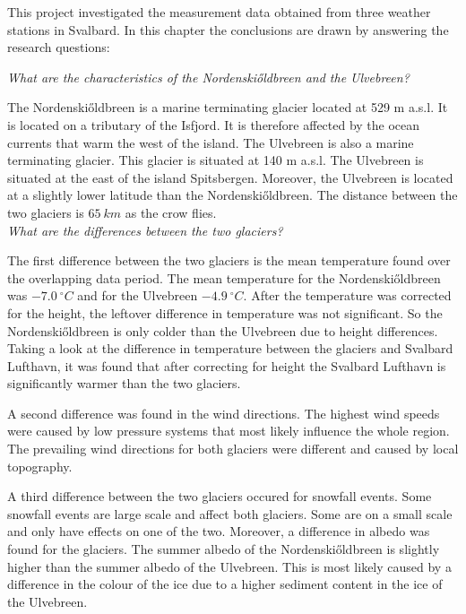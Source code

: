 \documentclass[11pt]{report}
\begin{document}
This project investigated the measurement data obtained from three weather stations in Svalbard. In this chapter the conclusions 
are drawn by answering the research questions:

\textit{What are the characteristics of the Nordenski\H{o}ldbreen and the Ulvebreen?}

The Nordenski\H{o}ldbreen is a marine terminating glacier located at 529 m a.s.l. It is located on a tributary of the Isfjord. It is therefore affected by the ocean currents that warm the west of the island. The Ulvebreen is also a marine terminating glacier. This glacier is situated at 140 m a.s.l. The Ulvebreen is situated at the east of the island Spitsbergen. Moreover, the Ulvebreen is located at a slightly lower latitude than the Nordenski\H{o}ldbreen. The distance between the two glaciers is $\SI{65}{km}$ as the crow flies. \\

\textit{What are the differences between the two glaciers?}

The first difference between the two glaciers is the mean temperature found over the overlapping data period. The mean temperature for the Nordenski\H{o}ldbreen was $\SI{-7.0}{^\circ C}$ and for the Ulvebreen $\SI{-4.9}{^\circ C}$. After the temperature was corrected for the height, the leftover difference in temperature was not significant. So the Nordenski\H{o}ldbreen is only colder than the Ulvebreen due to height differences. Taking a look at the difference in temperature between the glaciers and Svalbard Lufthavn, it was found that after correcting for height the Svalbard Lufthavn is significantly warmer than the two glaciers. 

A second difference was found in the wind directions. The highest wind speeds were caused by low pressure systems that most likely influence the whole region. The prevailing wind directions for both glaciers were different and caused by local topography.

A third difference between the two glaciers occured for snowfall events. Some snowfall events are large scale and affect both glaciers. Some are on a small scale and only have effects on one of the two. Moreover, a difference in albedo was found for the glaciers. The summer albedo of the Nordenski\H{o}ldbreen is slightly higher than the summer albedo of the Ulvebreen. This is most likely caused by a difference in the colour of the ice due to a higher sediment content in the ice of the Ulvebreen.\\
\end{document}
